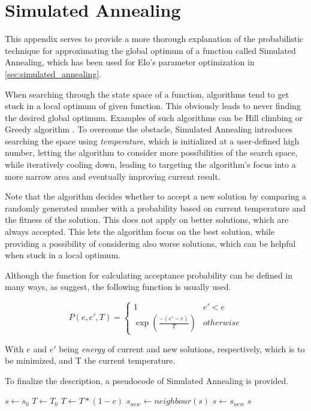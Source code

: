 \chapter{Simulated Annealing}
\label{ch:simulated_annealing}
This appendix serves to provide a more thorough explanation of the probabilistic technique for approximating the global optimum of a function called Simulated Annealing, which has been used for Elo's parameter optimization in \ref{sec:simulated_annealing}.

When searching through the state space of a function, algorithms tend to get stuck in a local optimum of given function. This obviously leads to never finding the desired global optimum. Examples of such algorithms can be Hill climbing \citep{RussellArtificialIntelligenceModern2003} or Greedy algorithm \citep{CormenIntroductionAlgorithmsThird2009}. To overcome the obstacle, Simulated Annealing introduces searching the space using \textit{temperature}, which is initialized at a user-defined high number, letting the algorithm to consider more possibilities of the search space, while iteratively cooling down, leading to targeting the algorithm's focus into a more narrow area and eventually improving current result.

\noindent Note that the algorithm decides whether to accept a new solution by comparing a randomly generated number with a probability based on current temperature and the fitness of the solution. This does not apply on better solutions, which are always accepted. This lets the algorithm focus on the best solution, while providing a possibility of considering also worse solutions, which can be helpful when stuck in a local optimum.

\noindent Although the function for calculating acceptance probability can be defined in many ways, as \citep{KirkpatrickOptimizationSimulatedAnnealing1983} suggest, the following function is usually used.

\begin{equation*}
P(e, e', T) = 
\begin{cases}
1 & e' < e \\
\exp\left(\frac{-(e'-e)}{T}\right) & otherwise
\end{cases}
\end{equation*}

\indent With $e$ and $e'$ being \textit{energy} of current and new solutions, respectively, which is to be minimized, and T the current temperature.

To finalize the description, a pseudocode of Simulated Annealing is provided.

\begin{algorithm}[H]
\begin{algorithmic}
\State $s \gets s_0$
\State $T \gets T_0$
	\State $T \gets T*(1-c)$
	\State $s_{new} \gets neighbour(s)$
		\State $s \gets s_{new}$
	\EndIf
\EndWhile
\State \Return $s$
\end{algorithmic}
\end{algorithm}